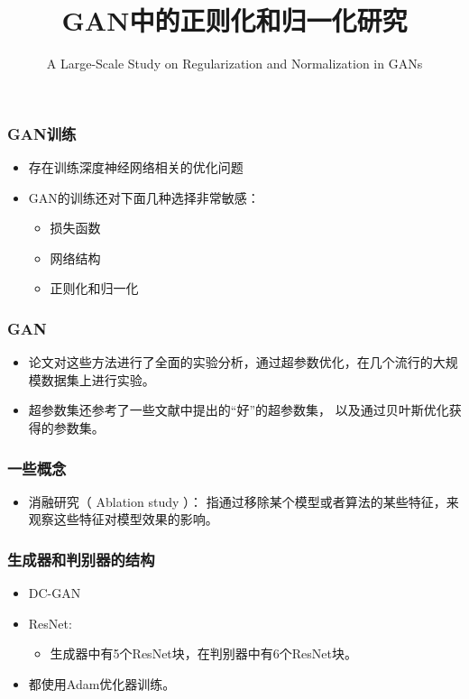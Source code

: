 \documentclass{beamer}
\author{A Large-Scale Study on Regularization and Normalization in GANs}
\title{GAN中的正则化和归一化研究}
\begin{document}
 
\frame{\titlepage}

\begin{frame}[c]\frametitle{GAN训练}
\begin{itemize}
    \item 存在训练深度神经网络相关的优化问题
    \item GAN的训练还对下面几种选择非常敏感：
    \begin{itemize}
        \item 损失函数
        \item 网络结构
        \item 正则化和归一化
    \end{itemize}

\end{itemize}
\end{frame}

\begin{frame}[c]\frametitle{GAN}
    \begin{itemize}
       \item 论文对这些方法进行了全面的实验分析，通过超参数优化，在几个流行的大规模数据集上进行实验。
       \item 超参数集还参考了一些文献中提出的“好”的超参数集， 以及通过贝叶斯优化获得的参数集。
    \end{itemize}
\end{frame}

\begin{frame}[c]\frametitle{一些概念}
    \begin{itemize}
        \item {\color{red}消融研究（ Ablation study ）}：
        指通过移除某个模型或者算法的某些特征，来观察这些特征对模型效果的影响。
    \end{itemize}
\end{frame}

\begin{frame}[c]\frametitle{生成器和判别器的结构}
    \begin{itemize}
        \item DC-GAN
        \item ResNet: 
        \begin{itemize}
            \item 生成器中有5个ResNet块，在判别器中有6个ResNet块。
        \end{itemize}
        \item 都使用Adam优化器训练。
    \end{itemize}
\end{frame}
\end{document}
